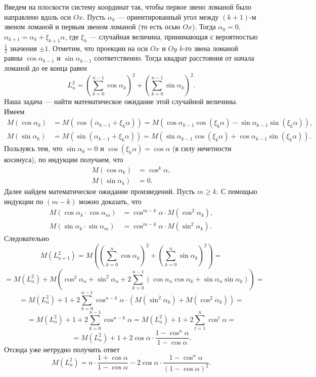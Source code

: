 \documentclass{article}
\begin{document}
Введем на плоскости систему координат так, чтобы первое звено ломаной было направлено вдоль оси $Ox$. Пусть $\alpha_k$ --- ориентированный угол между $(k+1)$-м звеном ломаной и первым звеном ломаной (то есть осью $Ox$). Тогда $\alpha_0=0$, $\alpha_{k+1} = \alpha_k + \xi_{k+1} \alpha$, где $\xi_k$ --- случайная величина, принимающая с вероятностью $\frac12$ значения $\pm 1$. Отметим, что проекции на оси $Ox$ и $Oy$ $k$-го звена ломаной равны $\cos \alpha_{k-1}$ и $\sin \alpha_{k-1}$ соответственно. Тогда квадрат расстояния от начала ломаной до ее конца равен
$$L_n^2 = \left( \sum\limits_{k=0}^{n-1} \cos \alpha_k \right)^2 + \left( \sum\limits_{k=0}^{n-1} \sin \alpha_k \right)^2.$$
Наша задача --- найти математическое ожидание этой случайной величины.\\
Имеем
\begin{align*}
M(\cos \alpha_k) &= M(\cos(\alpha_{k-1} + \xi_k \alpha)) = M(\cos \alpha_{k-1} \cos (\xi_k \alpha) - \sin \alpha_{k-1} \sin (\xi_k \alpha)),\\
M(\sin \alpha_k) &= M(\sin(\alpha_{k-1} + \xi_k \alpha)) = M(\sin \alpha_{k-1} \cos (\xi_k \alpha) + \cos \alpha_{k-1} \sin (\xi_k \alpha)).
\end{align*}
Пользуясь тем, что $\sin \alpha_0 = 0$ и $\cos (\xi_k \alpha) = \cos \alpha$ (в силу нечетности косинуса), по индукции получаем, что
\begin{align*}
M(\cos \alpha_k) &= \cos^k \alpha,\\
M(\sin \alpha_k) &= 0.
\end{align*}
Далее найдем математическое ожидание произведений. Пусть $m \geqslant k$. С помощью индукции по $(m-k)$ можно доказать, что
\begin{align*}
M(\cos \alpha_k \cdot \cos \alpha_m) &= \cos^{m-k} \alpha \cdot M(\cos^2 \alpha_k),\\
M(\sin \alpha_k \cdot \sin \alpha_m) &= \cos^{m-k} \alpha \cdot M(\sin^2 \alpha_k).
\end{align*}
Следовательно
$$M(L_{n+1}^2) = M \left( \left( \sum\limits_{k=0}^{n} \cos \alpha_k \right)^2 + \left( \sum\limits_{k=0}^{n} \sin \alpha_k \right)^2 \right) = $$
$$= M(L_{n}^2) + M \left( \cos^2 \alpha_n + \sin^2 \alpha_n + 2 \sum\limits_{k=0}^{n-1} (\cos \alpha_n \cos \alpha_k + \sin \alpha_n \sin \alpha_k) \right) = $$
$$= M(L_{n}^2) + 1 + 2 \sum\limits_{k=0}^{n-1} \cos^{n-k} \alpha \cdot (M(\sin^2 \alpha_k) + M(\cos^2 \alpha_k)) = $$
$$= M(L_{n}^2) + 1 + 2 \sum\limits_{k=0}^{n-1} \cos^{n-k} \alpha = M(L_{n}^2) + 1 + 2 \sum\limits_{t=1}^n \cos^t \alpha = $$
$$= M(L_{n}^2) + 1 + 2\cos \alpha \cdot \frac{1 - \cos^n \alpha}{1 - \cos \alpha}.$$
Отсюда уже нетрудно получить ответ
$$M(L_n^2) = n \cdot \frac{1+\cos \alpha}{1 - \cos \alpha} - 2 \cos \alpha \cdot \frac{1 - \cos^n \alpha}{(1 - \cos \alpha)^2}.$$
\end{document}
